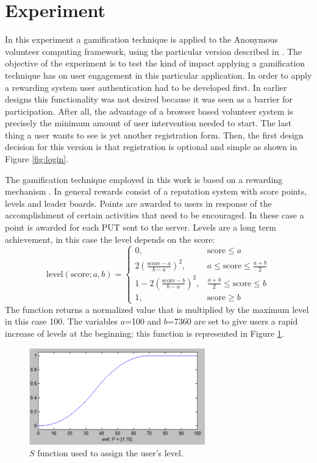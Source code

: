 \documentclass{llncs}
\begin{document}
\section{Experiment}
\label{sec:experiments}

In this experiment a gamification technique is applied to
the Anonymous
volunteer computing framework, using the
particular version described in \cite{DBLP:conf/gecco/MereloCGCRV16,2016arXiv160101607M}.
The objective of the experiment is to test the kind of impact
applying a gamification technique has on user engagement in this
particular application. In order to apply a rewarding system
user authentication had to be developed first. In earlier designs
this functionality was not desired because it was seen as a barrier
for participation. After all, the advantage of a browser based volunteer system
is precisely the minimum amount of user intervention needed to start.
The last thing a user wants to see is yet another registration form.
Then, the first design decision for this version is that registration is optional and simple as shown in Figure \ref{fig:login}.

The gamification technique employed in this work is based on a rewarding mechanism
\cite{dubois2013understanding}. In general rewards  consist of a reputation system
with score points, levels and leader boards. Points are awarded to users in response of
the accomplishment of certain activities that need to be encouraged. In these case
a point is awarded for each PUT sent to the server. Levels are a long
term achievement, in this case the level depends on the score:
\[ \text{level}(\text{score};a,b)=
    \begin{cases}
      0,                                    &  \text{score}\leq a\\
      2(\frac{\text{score}-a}{b-a})^{2},    &  a\leq \text{score}\leq \frac{a+b}{2}\\
      1-2(\frac{\text{score}-b}{b-a})^{2},  & \frac{a+b}{2} \leq \text{score}\leq b\\
      1,                                    & \text{score}\geq b
   \end{cases}
\]
The function returns a normalized value that is multiplied by the maximum level
in this case 100. The variables $a$=100 and $b$=7360 are set to give users a rapid increase of
levels at the beginning; this function is represented in Figure \ref{fig:s}.
%
\begin{figure}[htb]
    \centering
        \includegraphics[width=3in]{img/s.png}
    \caption{$S$ function used to assign the user's level.
    }
    \label{fig:s}
\end{figure}
\end{document}
